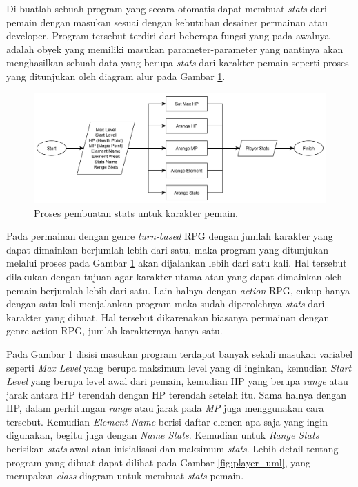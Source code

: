 Di buatlah sebuah program yang secara otomatis dapat membuat \textit{stats} dari pemain dengan masukan sesuai dengan kebutuhan desainer permainan atau developer. Program tersebut terdiri dari beberapa fungsi yang pada awalnya adalah obyek yang memiliki masukan parameter-parameter yang nantinya akan menghasilkan sebuah data yang berupa \textit{stats} dari karakter pemain seperti proses yang ditunjukan oleh diagram alur pada Gambar \ref{fig:player_stats_generator}.
\vspace{1ex}

\begin{figure} [!h] \centering
	\includegraphics[scale=0.037]{img/player_stats_generator.png}
	\caption{Proses pembuatan stats untuk karakter pemain.}
	\label{fig:player_stats_generator}
\end{figure}

Pada permainan dengan genre \textit{turn-based} RPG dengan jumlah karakter yang dapat dimainkan berjumlah lebih dari satu, maka program yang ditunjukan melalui proses pada Gambar \ref{fig:player_stats_generator} akan dijalankan lebih dari satu kali. Hal tersebut dilakukan dengan tujuan agar karakter utama atau yang dapat dimainkan oleh pemain berjumlah lebih dari satu. Lain halnya dengan \textit{action} RPG, cukup hanya dengan satu kali menjalankan program maka sudah diperolehnya \textit{stats} dari karakter yang dibuat. Hal tersebut dikarenakan biasanya permainan dengan genre action RPG, jumlah karakternya hanya satu.
\vspace{1ex}

Pada Gambar \ref{fig:player_stats_generator} disisi masukan program terdapat banyak sekali masukan variabel seperti \textit{Max Level} yang berupa maksimum level yang di inginkan, kemudian \textit{Start Level} yang berupa level awal dari pemain, kemudian HP yang berupa \textit{range} atau jarak antara HP terendah dengan HP terendah setelah itu. Sama halnya dengan HP, dalam perhitungan \textit{range} atau jarak pada \textit{MP} juga menggunakan cara tersebut. Kemudian \textit{Element Name} berisi daftar elemen apa saja yang ingin digunakan, begitu juga dengan \textit{Name Stats}. Kemudian untuk \textit{Range Stats} berisikan \textit{stats} awal atau inisialisasi dan maksimum \textit{stats}. Lebih detail tentang program yang dibuat dapat dilihat pada Gambar \ref{fig:player_uml}, yang merupakan \textit{class} diagram untuk membuat \textit{stats} pemain.
\vspace{1ex}

